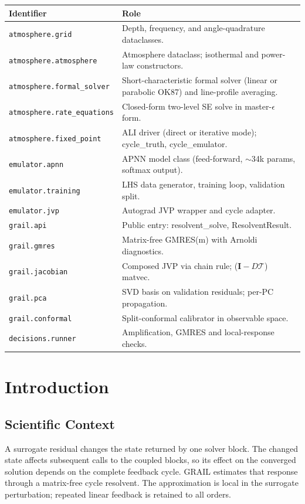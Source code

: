 \documentclass[11pt]{article}
\newcommand{\Tcyc}{\mathcal{T}}
\newcommand{\code}[1]{\texttt{#1}}
\begin{document}
{\small
\noindent\begin{tabular}{@{}p{2.0in}p{4.3in}@{}}
\toprule
\textbf{Identifier} & \textbf{Role} \\ \midrule
\code{atmosphere.grid}            & Depth, frequency, and angle-quadrature dataclasses. \\
\code{atmosphere.atmosphere}      & Atmosphere dataclass; isothermal and power-law constructors. \\
\code{atmosphere.formal\_solver}  & Short-characteristic formal solver (linear or parabolic OK87) and line-profile averaging. \\
\code{atmosphere.rate\_equations} & Closed-form two-level SE solve in master-$\epsilon$ form. \\
\code{atmosphere.fixed\_point}    & ALI driver (direct or iterative mode); cycle\_truth, cycle\_emulator. \\
\code{emulator.apnn}              & APNN model class (feed-forward, $\sim$34k params, softmax output). \\
\code{emulator.training}          & LHS data generator, training loop, validation split. \\
\code{emulator.jvp}               & Autograd JVP wrapper and cycle adapter. \\
\code{grail.api}                  & Public entry: resolvent\_solve, ResolventResult. \\
\code{grail.gmres}                & Matrix-free GMRES(m) with Arnoldi diagnostics. \\
\code{grail.jacobian}             & Composed JVP via chain rule; ($\mathbf{I} - D\Tcyc$) matvec. \\
\code{grail.pca}                  & SVD basis on validation residuals; per-PC propagation. \\
\code{grail.conformal}            & Split-conformal calibrator in observable space. \\
\code{decisions.runner}           & Amplification, GMRES and local-response checks. \\
\bottomrule
\end{tabular}
}

\section{Introduction}
\subsection{Scientific Context}
\label{sec:scientific-context}
A surrogate residual changes the state returned by one solver block.
The changed state affects subsequent calls to the coupled blocks, so its
effect on the converged solution depends on the complete feedback cycle.
GRAIL estimates that response through a matrix-free cycle resolvent.
The approximation is local in the surrogate perturbation; repeated
linear feedback is retained to all orders.
\end{document}
